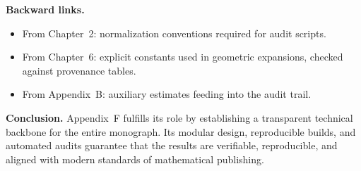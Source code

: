 \medskip
\noindent \textbf{Backward links.}
\begin{itemize}
  \item From Chapter~2: normalization conventions required for audit scripts.
  \item From Chapter~6: explicit constants used in geometric expansions, checked against provenance tables.
  \item From Appendix~B: auxiliary estimates feeding into the audit trail.
\end{itemize}

\medskip
\noindent \textbf{Conclusion.}
Appendix~F fulfills its role by establishing a transparent technical backbone for the entire monograph. Its modular design, reproducible builds, and automated audits guarantee that the results are verifiable, reproducible, and aligned with modern standards of mathematical publishing.
